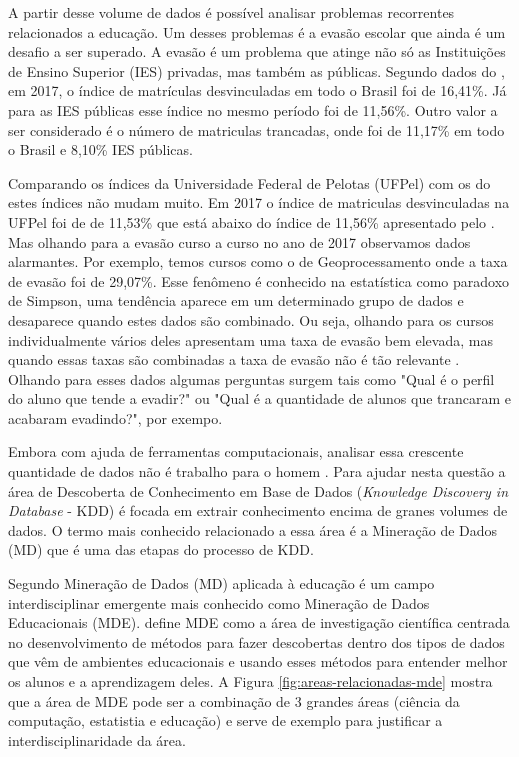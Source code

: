 \documentclass[diss-proposta,nocipinfo]{texufpel}
\begin{document}
A partir desse volume de dados é possível analisar problemas recorrentes relacionados a educação. Um desses problemas é a evasão escolar que ainda é um desafio a ser superado.
A evasão é um problema que atinge não só as Instituições de Ensino Superior (IES) privadas, mas também as públicas. Segundo dados do \citet{inep:2018}, em 2017, o índice de matrículas desvinculadas em todo o Brasil foi de 16,41\%. Já para as IES públicas esse índice no mesmo período foi de 11,56\%. Outro valor a ser considerado é o número de matriculas trancadas, onde foi de 11,17\% em todo o Brasil e 8,10\% IES públicas.

Comparando os índices da Universidade Federal de Pelotas (UFPel) com os do \citet{inep:2018} estes índices não mudam muito. Em 2017 o índice de matriculas desvinculadas na UFPel foi de de 11,53\% que está abaixo do índice de 11,56\% apresentado pelo \citet{inep:2018}. Mas olhando para a evasão curso a curso no ano de 2017 observamos dados alarmantes. Por exemplo, temos cursos como o de Geoprocessamento onde a taxa de evasão foi de 29,07\%.  Esse fenômeno é conhecido na estatística como paradoxo de Simpson, uma tendência aparece em um determinado grupo de dados e desaparece quando estes dados são combinado. Ou seja, olhando para os cursos individualmente vários deles apresentam uma taxa de evasão bem elevada, mas quando essas taxas são combinadas a taxa de evasão não é tão relevante \cite{wagner1982simpson}. Olhando para esses dados algumas perguntas surgem tais como "Qual é o perfil do aluno que tende a evadir?" ou "Qual é a quantidade de alunos que trancaram e acabaram evadindo?", por exempo.

Embora com ajuda de ferramentas computacionais, analisar essa crescente quantidade de dados não é trabalho para o homem \cite{goldschmidt2015data}. Para ajudar nesta questão a área de Descoberta de Conhecimento em Base de Dados (\textit{Knowledge Discovery in Database} - KDD) é focada em extrair conhecimento encima de granes volumes de dados. O termo mais conhecido relacionado a essa área é a Mineração de Dados (MD) que é uma das etapas do processo de KDD.

Segundo \citet{Koedinger2008} Mineração de Dados (MD) aplicada à educação é um campo interdisciplinar emergente mais conhecido como Mineração de Dados Educacionais (MDE).
\citet{baker2010data} define MDE como a área de investigação científica centrada no desenvolvimento de métodos para fazer descobertas dentro dos tipos de dados que vêm de ambientes educacionais e usando esses métodos para entender melhor os alunos e a aprendizagem deles. A Figura \ref{fig:areas-relacionadas-mde} mostra que a área de MDE pode ser a combinação de 3 grandes áreas (ciência da computação, estatistia e educação) e serve de exemplo para justificar a interdisciplinaridade da área.
\end{document}
